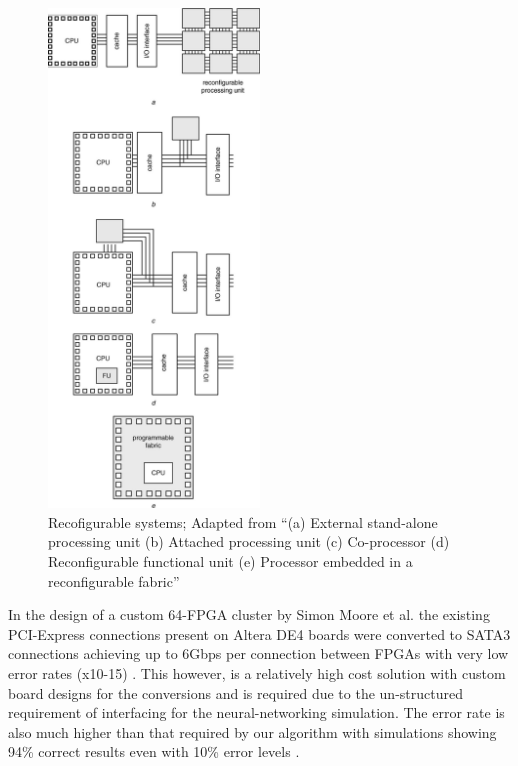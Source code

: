 \begin{figure}[!h]
  \centering
  \includegraphics[width=0.5\textwidth]{./figs/fpga_cluster.png}
  \caption{Recofigurable systems; Adapted from \cite{compton2002reconfigurable}
  “(a) External stand-alone processing unit
(b) Attached processing unit
(c) Co-processor
(d) Reconﬁgurable functional unit
(e) Processor embedded in a reconﬁgurable fabric”
\cite{todman2005reconfigurable}}
  \label{fig:CE}
\end{figure}

In the design of a custom 64-FPGA cluster by Simon Moore et al. the existing PCI-Express connections present on Altera DE4 boards were converted to SATA3 connections achieving up to 6Gbps per connection between FPGAs with very low error rates (x10-15) \cite{moore2012bluehive}. This however, is a relatively high cost solution with custom board designs for the conversions and is required due to the un-structured requirement of interfacing for the neural-networking simulation. The error rate is also much higher than that required by our algorithm with simulations showing 94\% correct results even with 10\% error levels \cite{hu2012cmos}. 


